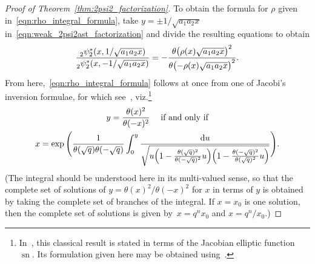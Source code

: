 \documentclass[10pt,a4paper]{amsart}
\numberwithin{equation}{section}
\newcommand{\dd}{\mathrm{d}}
\begin{document}
\begin{proof}[Proof of Theorem~\ref{thm:2psi2_factorization}]
To obtain the formula for $\rho$ given in~\eqref{eqn:rho_integral_formula}, take $y=\pm1/\sqrt{a_1a_2x}$ in~\eqref{eqn:weak_2psi2ast_factorization} and divide the resulting equations to obtain
\[ {_2^{}\psi_2^\ast(x,1/\sqrt{a_1a_2x}) \over _2^{}\psi_2^\ast(x,-1/\sqrt{a_1a_2x})} = -{\theta \bigl( \rho(x)\sqrt{a_1a_2x} \bigr)^2 \over \theta \bigl({-}\rho(x)\sqrt{a_1a_2x} \bigr)^2}. \]
From here,~\eqref{eqn:rho_integral_formula} follows at once from one of Jacobi's inversion formulae, for which see~\cite[p.~480]{Whittaker1927}, viz.\footnote{In~\cite{Whittaker1927}, this classical result is stated in terms of the Jacobian elliptic function $\operatorname{sn}$. Its formulation given here may be obtained using~\cite[equation~(A), p.~492]{Whittaker1927}.}
\begin{gather*}
 y = {\theta(x)^2 \over \theta(-x)^2} \quad\; \text{if and only if} \\
 x = \exp \Bigg( {1 \over \theta(\sqrt{q})\theta(-\sqrt{q})} \int_0^y {\dd u \over \sqrt{u\Bigl( 1-{\theta(\sqrt{q})^2 \over \theta(-\sqrt{q})^2}u\Bigr)\Bigl( 1-{\theta(-\sqrt{q})^2 \over \theta(\sqrt{q})^2}u\Bigr)}} \Bigg).
 \end{gather*}
(The integral should be understood here in its multi-valued sense, so that the complete set of solutions of $y=\theta(x)^2/\theta(-x)^2$ for $x$ in terms of $y$ is obtained by taking the complete set of branches of the integral. If $x=x_0$ is one solution, then the complete set of solutions is given by~${x=q^n x_0}$ and $x=q^n/x_0$.)


\end{proof}
\end{document}
